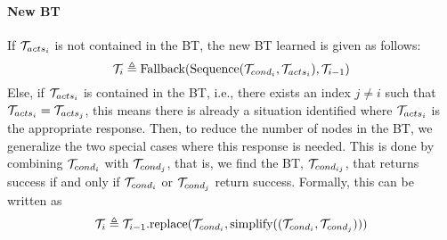 \paragraph*{\textbf{New BT}}
 If $\mathcal{T}_{acts_i}$ is not contained in the BT, the new BT learned is given as follows: 
\begin{equation}
\label{PA.eq.newBT}
\mathcal{T}_i\triangleq \mbox{Fallback}(\mbox{Sequence}(\mathcal{T}_{cond_i}, \mathcal{T}_{acts_i}), \mathcal{T}_{i-1})
\end{equation}
Else, if $\mathcal{T}_{acts_i}$ is contained in the BT, i.e., there exists an index $j \neq i$ such that $\mathcal{T}_{acts_i}=\mathcal{T}_{acts_j}$,
this means there is already a situation identified where $\mathcal{T}_{acts_i}$ is the appropriate response. 
Then, to reduce the number of nodes in the BT, 
we generalize the two special cases where this response is needed.
This is done by combining $\mathcal{T}_{cond_i}$ with $\mathcal{T}_{cond_j}$, that is, we find the BT, $\mathcal{T}_{cond_{ij}}$, that returns success if and only if $\mathcal{T}_{cond_i}$ or $\mathcal{T}_{cond_j}$ return success. Formally, this can be written as
\begin{equation}
\label{PA.eq.newBT2}
\mathcal{T}_i\triangleq \mathcal{T}_{i-1}.\mbox{replace}(\mathcal{T}_{cond_i},\mbox{simplify}((\mathcal{T}_{cond_i},\mathcal{T}_{cond_j})))
\end{equation}

